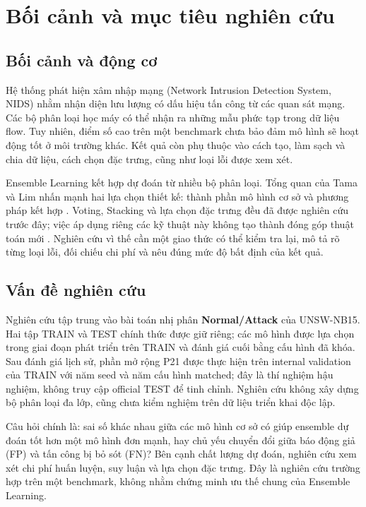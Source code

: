 \section{Bối cảnh và mục tiêu nghiên cứu}
\label{chap:gioi-thieu}

\subsection{Bối cảnh và động cơ}
Hệ thống phát hiện xâm nhập mạng (Network Intrusion Detection System, NIDS) nhằm nhận diện lưu lượng có dấu hiệu tấn công từ các quan sát mạng. Các bộ phân loại học máy có thể nhận ra những mẫu phức tạp trong dữ liệu flow. Tuy nhiên, điểm số cao trên một benchmark chưa bảo đảm mô hình sẽ hoạt động tốt ở môi trường khác. Kết quả còn phụ thuộc vào cách tạo, làm sạch và chia dữ liệu, cách chọn đặc trưng, cũng như loại lỗi được xem xét.

Ensemble Learning kết hợp dự đoán từ nhiều bộ phân loại. Tổng quan của Tama và Lim nhấn mạnh hai lựa chọn thiết kế: thành phần mô hình cơ sở và phương pháp kết hợp \cite{legacyL01}. Voting, Stacking và lựa chọn đặc trưng đều đã được nghiên cứu trước đây; việc áp dụng riêng các kỹ thuật này không tạo thành đóng góp thuật toán mới \cite{legacyL04,legacyL05,legacyL06,legacyL12}. Nghiên cứu vì thế cần một giao thức có thể kiểm tra lại, mô tả rõ từng loại lỗi, đối chiếu chi phí và nêu đúng mức độ bất định của kết quả.

\subsection{Vấn đề nghiên cứu}
Nghiên cứu tập trung vào bài toán nhị phân \textbf{Normal/Attack} của UNSW-NB15. Hai tập TRAIN và TEST chính thức được giữ riêng; các mô hình được lựa chọn trong giai đoạn phát triển trên TRAIN và đánh giá cuối bằng cấu hình đã khóa. Sau đánh giá lịch sử, phần mở rộng P21 được thực hiện trên internal validation của TRAIN với năm seed và năm cấu hình matched; đây là thí nghiệm hậu nghiệm, không truy cập official TEST để tinh chỉnh. Nghiên cứu không xây dựng bộ phân loại đa lớp, cũng chưa kiểm nghiệm trên dữ liệu triển khai độc lập.

Câu hỏi chính là: sai số khác nhau giữa các mô hình cơ sở có giúp ensemble dự đoán tốt hơn một mô hình đơn mạnh, hay chủ yếu chuyển đổi giữa báo động giả (FP) và tấn công bị bỏ sót (FN)? Bên cạnh chất lượng dự đoán, nghiên cứu xem xét chi phí huấn luyện, suy luận và lựa chọn đặc trưng. Đây là nghiên cứu trường hợp trên một benchmark, không nhằm chứng minh ưu thế chung của Ensemble Learning.

